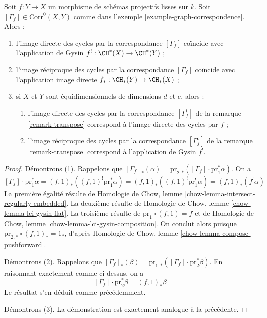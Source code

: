 \begin{lemma}
\label{lemma-functor-and-cycles}
Soit $f : Y \to X$ un morphisme de schémas projectifs lisses sur $k$.
Soit $[\Gamma_f] \in \text{Corr}^0(X, Y)$ comme dans
l'exemple \ref{example-graph-correspondence}. Alors :
\begin{enumerate}
\item l'image directe des cycles par la correspondance $[\Gamma_f]$
coïncide avec l'application de Gysin $f^! : \CH^*(X) \to \CH^*(Y)$ ;
\item l'image réciproque des cycles par la correspondance $[\Gamma_f]$
coïncide avec l'application image directe $f_* : \CH_*(Y) \to \CH_*(X)$ ;
\item si $X$ et $Y$ sont équidimensionnels de dimensions $d$ et $e$,
alors :
\begin{enumerate}
\item l'image directe des cycles par la correspondance
$[\Gamma_f^t]$ de la remarque \ref{remark-transpose}
correspond à l'image directe des cycles par $f$ ;
\item l'image réciproque des cycles par la correspondance
$[\Gamma_f^t]$ de la remarque \ref{remark-transpose}
correspond à l'application de Gysin $f^!$.
\end{enumerate}
\end{enumerate}
\end{lemma}

\begin{proof}
Démontrons (1). Rappelons que
$[\Gamma_f]_*(\alpha) =
\text{pr}_{2, *}([\Gamma_f] \cdot \text{pr}_1^*\alpha)$.
On a
$$
[\Gamma_f] \cdot \text{pr}_1^*\alpha =
(f, 1)_*((f, 1)^! \text{pr}_1^*\alpha) =
(f, 1)_*((f, 1)^! \text{pr}_1^!\alpha) =
(f, 1)_*(f^!\alpha)
$$
La première égalité résulte de Homologie de Chow, lemme
\ref{chow-lemma-intersect-regularly-embedded}.
La deuxième résulte de
Homologie de Chow, lemme \ref{chow-lemma-lci-gysin-flat}.
La troisième résulte de $\text{pr}_1 \circ (f, 1) = f$ et de
Homologie de Chow, lemme \ref{chow-lemma-lci-gysin-composition}.
On conclut alors puisque
$\text{pr}_{2, *} \circ (f, 1)_* = 1_*$, d'après
Homologie de Chow, lemme \ref{chow-lemma-compose-pushforward}.

\medskip\noindent
Démontrons (2). Rappelons que $[\Gamma_f]_*(\beta) =
\text{pr}_{1, *}([\Gamma_f] \cdot \text{pr}_2^*\beta)$.
En raisonnant exactement comme ci-dessus, on a
$$
[\Gamma_f] \cdot \text{pr}_2^*\beta = (f, 1)_*\beta
$$
Le résultat s'en déduit comme précédemment.

\medskip\noindent
Démontrons (3). La démonstration est exactement analogue à la précédente.
\end{proof}

